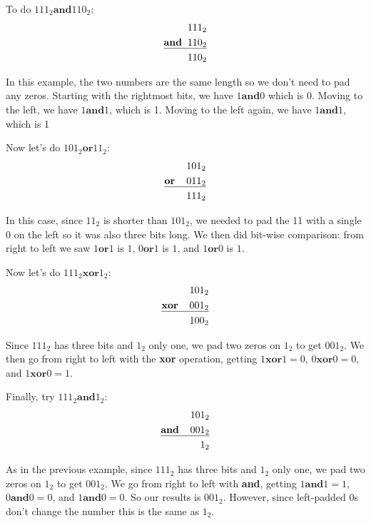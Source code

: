 To do $111_2\textbf{and}110_2$:
\begin{align*}
111_2 &\\
\underline{\textbf{and}\hspace{2mm}110_2}&\\
110_2 &\\
\end{align*}

In this example, the two numbers are the same length so we don't need to pad any zeros. Starting with the rightmost bits, we have $1\mathbf{and}0$ which is $0$. Moving to the left, we have $1\mathbf{and}1$, which is 1. Moving to the left again, we have $1\mathbf{and}1$, which is 1

Now let's do $101_2\mathbf{or}11_2$:
\begin{align*}
101_2 &\\
\underline{\mathbf{or}\hspace{4mm}011_2}&\\
111_2&\\
\end{align*}

In this case, since $11_2$ is shorter than $101_2$, we needed to pad the 11 with a single 0 on the left so it was also three bits long. We then did bit-wise comparison: from right to left we saw $1\mathbf{or}1$ is $1$, $0\mathbf{or}1$ is $1$, and $1\mathbf{or}0$ is $1$. 

Now let's do $111_2\mathbf{xor}1_2$:
\begin{align*}
101_2 &\\
\underline{\mathbf{xor}\hspace{4mm}001_2}&\\
100_2 &\\
\end{align*}

Since $111_2$ has three bits and $1_2$ only one, we pad two zeros on $1_2$ to get $001_2$. We then go from right to left with the \textbf{xor} operation, getting $1\textbf{xor}1=0$, $0\textbf{xor}0=0$, and $1\textbf{xor}0=1$.

Finally, try $111_2\mathbf{and}1_2$:
\begin{align*}
101_2 &\\
\underline{\mathbf{and}\hspace{4mm}001_2}&\\
1_2 &\\
\end{align*}

As in the previous example, since $111_2$ has three bits and $1_2$ only one, we pad two zeros on $1_2$ to get $001_2$. We go from right to left with \textbf{and}, getting $1\textbf{and}1=1$, $0\textbf{and}0=0$, and $1\textbf{and}0=0$. So our results is $001_2$. However, since left-padded 0s don't change the number this is the same as $1_2$. 

